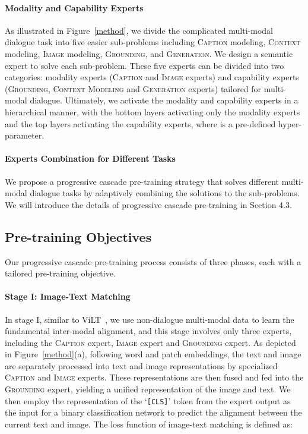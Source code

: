 \documentclass[11pt]{article}
\begin{document}
\paragraph{Modality and Capability Experts}
As illustrated in Figure~\ref{method}, we divide the complicated multi-modal dialogue task into five easier sub-problems including \textsc{Caption} modeling, \textsc{Context} modeling, \textsc{Image} modeling, \textsc{Grounding}, and \textsc{Generation}. We design a semantic expert to solve each sub-problem. These five experts can be divided into two categories: modality experts (\textsc{Caption} and \textsc{Image} experts) and capability experts (\textsc{Grounding}, \textsc{Context Modeling} and \textsc{Generation} experts) tailored for multi-modal dialogue. Ultimately, we activate the modality and capability experts in a hierarchical manner, with the bottom  layers activating only the modality experts and the top  layers activating the capability experts, where  is a pre-defined hyper-parameter.



\paragraph{Experts Combination for Different Tasks}
We propose a progressive cascade pre-training strategy that solves different multi-modal dialogue tasks by adaptively combining the solutions to the sub-problems. 
We will introduce the details of progressive cascade pre-training in Section 4.3.  

\subsection{Pre-training Objectives}
Our progressive cascade pre-training process consists of three phases, each with a tailored pre-training objective. 


\paragraph{Stage I: Image-Text Matching}
In stage I, similar to ViLT~\citep{kim2021vilt}, we use non-dialogue multi-modal data  to learn the fundamental inter-modal alignment, and this stage involves only three experts, including the \textsc{Caption} expert,  \textsc{Image} expert and  \textsc{Grounding} expert.
As depicted in Figure~\ref{method}(a), following word and patch embeddings, the text and image are separately processed into text and image representations by specialized \textsc{Caption} and \textsc{Image} experts. These representations are then fused and fed into the \textsc{Grounding} expert, yielding a unified representation of the image and text. We then employ the representation of the `\texttt{[CLS]}' token from the expert output as the input for a binary classification network to predict the alignment between the current text and image. The loss function of image-text matching is defined as:
\end{document}
